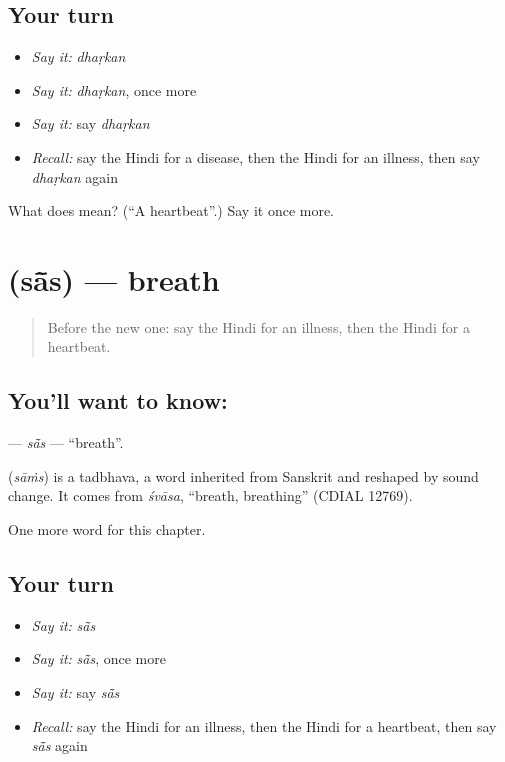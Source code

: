 \subsection*{Your turn}
\begin{itemize}
\raggedright
  \item \emph{Say it:} \emph{dhaṛkan}
  \item \emph{Say it:} \emph{dhaṛkan}, once more
  \item \emph{Say it:} say \emph{dhaṛkan}
  \item \emph{Recall:} say the Hindi for a disease, then the Hindi for an illness, then say \emph{dhaṛkan} again
\end{itemize}

\begin{tcolorbox}[breakable,colback=teal!4,colframe=teal!35!black,title={Before you move on}]
What does  mean? (\textquotedblleft{}A heartbeat\textquotedblright{}.) Say it once more.
\end{tcolorbox}
\section[\texorpdfstring{\hi{साँस} (sā̃s)}{साँस (sā̃s)}]{ (sā̃s) — breath}

\label{lesson:HI-C274-saas}



\begin{quote}
Before the new one: say the Hindi for an illness, then the Hindi for a heartbeat.
\end{quote}

\subsection*{You'll want to know: }
\textbf{} — \emph{sā̃s} — \textquotedblleft{}breath\textquotedblright{}.

\begin{cousinweb}
\textbf{} (\emph{sāṁs}) is a tadbhava, a word inherited from Sanskrit and reshaped by sound change. It comes from \emph{śvāsa}, \textquotedblleft{}breath, breathing\textquotedblright{} (CDIAL 12769).
\end{cousinweb}

\begin{grammarlens}[title={What you've built}]
One more word for this chapter.
\end{grammarlens}

\subsection*{Your turn}
\begin{itemize}
\raggedright
  \item \emph{Say it:} \emph{sā̃s}
  \item \emph{Say it:} \emph{sā̃s}, once more
  \item \emph{Say it:} say \emph{sā̃s}
  \item \emph{Recall:} say the Hindi for an illness, then the Hindi for a heartbeat, then say \emph{sā̃s} again
\end{itemize}

